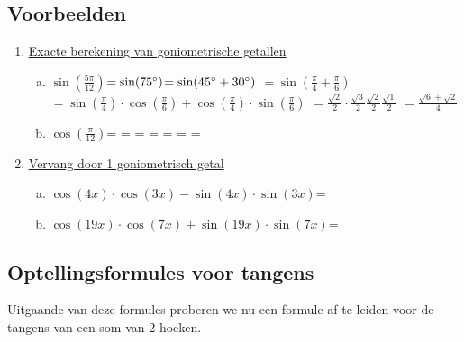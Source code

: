 \documentclass[a4paper,12pt]{article}
\begin{document}
\subsection{Voorbeelden}
\begin{enumerate}[(1)]
\item \underline{Exacte berekening van goniometrische getallen}
  \begin{enumerate}[(a)]
    \item $\sin(\frac{5\pi}{12})$\newline$=\sin(75^\circ)$\newline$=\sin(45^\circ+30^\circ)$
      \newline$=\sin(\frac{\pi}{4}+\frac{\pi}{6})$\newline
      $=\sin(\frac{\pi}{4})\cdot \cos(\frac{\pi}{6})+\cos(\frac{\pi}{4})\cdot \sin(\frac{\pi}{6})$
      \newline $=\frac{\sqrt{2}}{2}\cdot \frac{\sqrt{3}}{2}\frac{\sqrt{2}}{2}\frac{\sqrt{1}}{2}$\newline
      $=\frac{\sqrt{6}+\sqrt{2}}{4}$
    \item $\cos(\frac{\pi}{12})$\newline = \dotfill
      \newline = \dotfill \newline = \dotfill \newline = \dotfill \newline = \dotfill 
      \newline = \dotfill \newline = \dotfill
  \end{enumerate}
\item \underline{Vervang door 1 goniometrisch getal}
  \begin{enumerate}[(a)]
    \item $\cos(4x)\cdot \cos(3x)-\sin(4x)\cdot \sin(3x)$\newline = \dotfill
    \item $\cos(19x)\cdot \cos(7x)+\sin(19x)\cdot \sin(7x)$\newline = \dotfill
  \end{enumerate}
\end{enumerate}

\subsection{Optellingsformules voor tangens}
Uitgaande van deze formules proberen we nu een formule af te leiden voor de tangens van een som van 2 hoeken.
\end{document}
